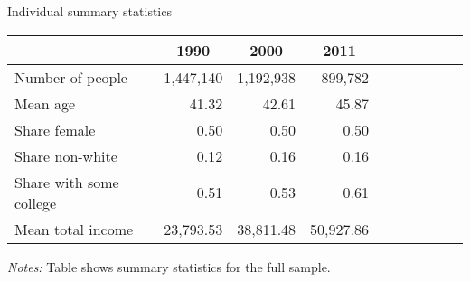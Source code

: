 \begin{center}
\begin{adjustbox}{max width=.9\textwidth}
\begin{threeparttable}[!h]
\caption{Individual summary statistics}
\label{tab:table_1}
\begin{tabular}{lrrrrrrrrr}
\toprule
\toprule
\textbf{}&\multicolumn{1}{c}{\textbf{1990}}&\multicolumn{1}{c}{\textbf{2000}}&\multicolumn{1}{c}{\textbf{2011}} \\
\midrule
Number of people & 1,447,140 & 1,192,938 &   899,782 \\ 
Mean age &     41.32 &     42.61 &     45.87 \\ 
Share female &      0.50 &      0.50 &      0.50 \\ 
Share non-white &      0.12 &      0.16 &      0.16 \\ 
Share with some college &      0.51 &      0.53 &      0.61 \\ 
Mean total income & 23,793.53 & 38,811.48 & 50,927.86 \\ 
\bottomrule
\bottomrule
\end{tabular}
\begin{tablenotes}
\item \footnotesize \textit{Notes:} Table shows summary statistics for the full sample. 
\end{tablenotes}
\end{threeparttable}
\end{adjustbox}
\end{center}
